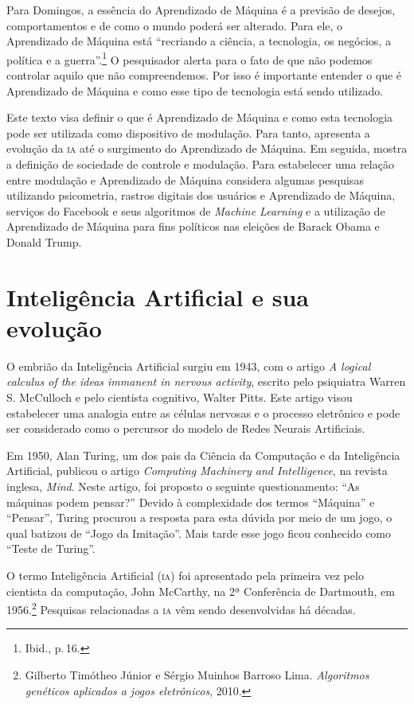 Para Domingos, a essência do Aprendizado de Máquina é a previsão
de desejos, comportamentos e de como o mundo poderá ser alterado. Para
ele, o Aprendizado de Máquina está ``recriando a ciência, a tecnologia,
os negócios, a política e a guerra''.\footnote{Ibid., p.\,16.} O pesquisador alerta para
o fato de que não podemos controlar aquilo que não compreendemos. Por
isso é importante entender o que é Aprendizado de Máquina e como esse
tipo de tecnologia está sendo utilizado.

Este texto visa definir o que é Aprendizado de Máquina e como esta
tecnologia pode ser utilizada como dispositivo de modulação. Para tanto,
apresenta a evolução da \textsc{ia} até o surgimento do Aprendizado de Máquina.
Em seguida, mostra a definição de sociedade de controle e modulação.
Para estabelecer uma relação entre modulação e Aprendizado de Máquina
considera algumas pesquisas utilizando psicometria, rastros digitais dos
usuários e Aprendizado de Máquina, serviços do Facebook e seus
algoritmos de \emph{Machine Learning} e a utilização de Aprendizado de
Máquina para fins políticos nas eleições de Barack Obama e Donald Trump.

\section{Inteligência Artificial e sua evolução}

O embrião da Inteligência Artificial surgiu em 1943, com o artigo
\emph{A logical calculus of the ideas immanent in nervous activity},
escrito pelo psiquiatra Warren S. McCulloch e
pelo cientista cognitivo, Walter Pitts. Este artigo visou estabelecer
uma analogia entre as células nervosas e o processo eletrônico e pode ser considerado como o percursor do modelo de Redes Neurais Artificiais.

Em 1950, Alan Turing, um dos pais da Ciência da Computação e da
Inteligência Artificial, publicou o artigo \emph{Computing Machinery
and Intelligence}, na revista inglesa, \emph{Mind}.
Neste artigo, foi proposto o seguinte questionamento: ``As máquinas
podem pensar?'' Devido à complexidade dos termos ``Máquina'' e
``Pensar'', Turing procurou a resposta para esta dúvida por meio de um
jogo, o qual batizou de ``Jogo da Imitação''. Mais tarde
esse jogo ficou conhecido como ``Teste de Turing''.

O termo Inteligência Artificial (\textsc{ia}) foi apresentado pela primeira vez
pelo cientista da computação, John McCarthy, na 2ª Conferência de
Dartmouth, em 1956.\footnote{Gilberto Timótheo Júnior e Sérgio Muinhos Barroso Lima. \emph{Algoritmos genéticos aplicados a jogos eletrônicos}, 2010.} Pesquisas relacionadas a \textsc{ia} vêm sendo desenvolvidas há décadas.

